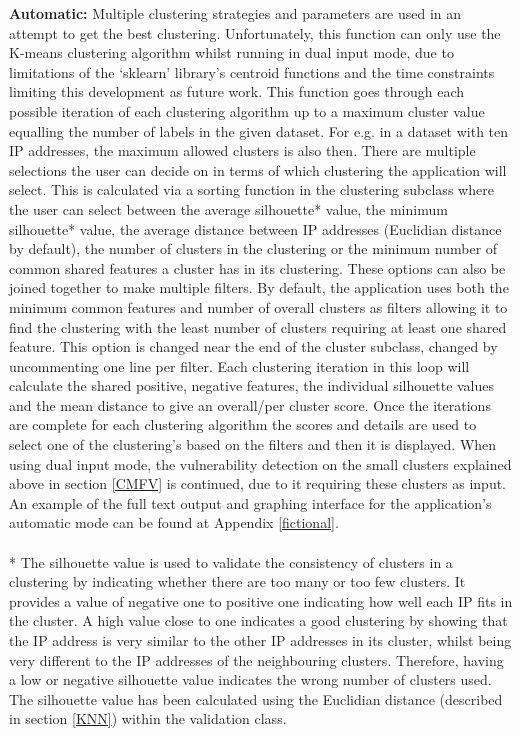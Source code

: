     \textbf{Automatic:}
     Multiple clustering strategies and parameters are used in an attempt to get the best clustering. Unfortunately, this function can only use the K-means clustering algorithm whilst running in dual input mode, due to limitations of the ‘sklearn’ library’s centroid functions and the time constraints limiting this development as future work. This function goes through each possible iteration of each clustering algorithm up to a maximum cluster value equalling the number of labels in the given dataset. For e.g. in a dataset with ten IP addresses, the maximum allowed clusters is also then. There are multiple selections the user can decide on in terms of which clustering the application will select. This is calculated via a sorting function in the clustering subclass where the user can select between the average silhouette* value, the minimum silhouette* value, the average distance between IP addresses (Euclidian distance by default), the number of clusters in the clustering or the minimum number of common shared features a cluster has in its clustering. These options can also be joined together to make multiple filters. By default, the application uses both the minimum common features and number of overall clusters as filters allowing it to find the clustering with the least number of clusters requiring at least one shared feature. This option is changed near the end of the cluster subclass, changed by uncommenting one line per filter. Each clustering iteration in this loop will calculate the shared positive, negative features, the individual silhouette values and the mean distance to give an overall/per cluster score. Once the iterations are complete for each clustering algorithm the scores and details are used to select one of the clustering’s based on the filters and then it is displayed. When using dual input mode, the vulnerability detection on the small clusters explained above in section \ref{CMFV} is continued, due to it requiring these clusters as input. An example of the full text output and graphing interface for the application’s automatic mode can be found at Appendix \ref{fictional}.\linebreak
\paragraph{}* The silhouette value is used to validate the consistency of clusters in a clustering by indicating whether there are too many or too few clusters. It provides a value of negative one to positive one indicating how well each IP fits in the cluster.  A high value close to one indicates a good clustering by showing that the IP address is very similar to the other IP addresses in its cluster, whilst being very different to the IP addresses of the neighbouring clusters. Therefore, having a low or negative silhouette value indicates the wrong number of clusters used. The silhouette value has been calculated using the Euclidian distance (described in section \ref{KNN}) within the validation class.
     
